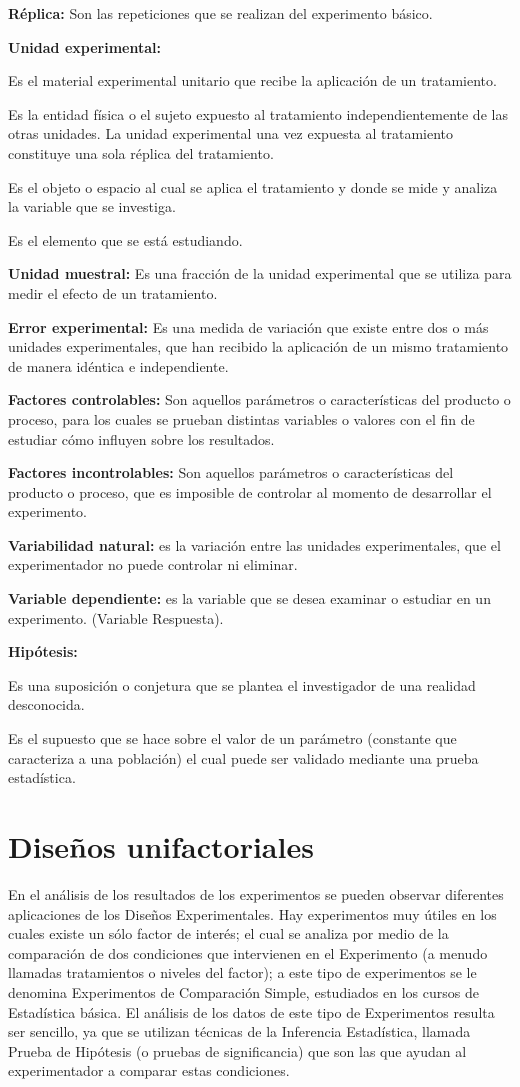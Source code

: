 \documentclass[12pt,letterpaper]{report}
\begin{document}
\textbf{Réplica:} Son las repeticiones que se realizan del experimento básico.

\textbf{Unidad experimental:}

Es el material experimental unitario que recibe la aplicación de un tratamiento.

Es la entidad física o el sujeto expuesto al tratamiento independientemente de las
otras unidades. La unidad experimental una vez expuesta al tratamiento constituye
una sola réplica del tratamiento.

Es el objeto o espacio al cual se aplica el tratamiento y donde se mide y analiza la
variable que se investiga.

Es el elemento que se está estudiando.

\textbf{Unidad muestral:} Es una fracción de la unidad experimental que se utiliza 
para medir el efecto de un tratamiento.

\textbf{Error experimental:} Es una medida de variación que existe entre dos o 
más unidades experimentales, que han recibido la aplicación de un mismo tratamiento de
manera idéntica e independiente.

\textbf{Factores controlables:} Son aquellos parámetros o características del 
producto o proceso, para los cuales se prueban distintas variables o
valores con el fin de estudiar cómo influyen sobre los resultados.

\textbf{Factores incontrolables:} Son aquellos parámetros o características del 
producto o proceso, que es imposible de controlar al momento de
desarrollar el experimento.

\textbf{Variabilidad natural:} es la variación entre las unidades experimentales, 
que el experimentador no puede controlar ni eliminar.

\textbf{Variable dependiente:} es la variable que se desea examinar o estudiar en 
un experimento. (Variable Respuesta).

\textbf{Hipótesis:}

Es una suposición o conjetura que se plantea el investigador de una realidad
desconocida.

Es el supuesto que se hace sobre el valor de un parámetro (constante que caracteriza
a una población) el cual puede ser validado mediante una prueba estadística.

\newpage
\chapter*{Diseños unifactoriales}
En el análisis de los resultados de los experimentos se pueden observar diferentes
aplicaciones de los Diseños Experimentales. Hay experimentos muy útiles en los cuales existe
un sólo factor de interés; el cual se analiza por medio de la comparación de dos condiciones
que intervienen en el Experimento (a menudo llamadas tratamientos o niveles del factor); a
este tipo de experimentos se le denomina Experimentos de Comparación Simple,
estudiados en los cursos de Estadística básica. El análisis de los datos de este tipo de
Experimentos resulta ser sencillo, ya que se utilizan técnicas de la Inferencia Estadística,
llamada Prueba de Hipótesis (o pruebas de significancia) que son las que ayudan al
experimentador a comparar estas condiciones.
\end{document}
